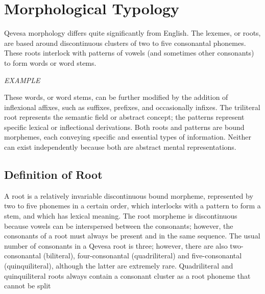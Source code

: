\documentclass[grammar]{subfiles}
\begin{document}
	\chapter{Morphological Typology}
	\label{ch:morphological_typology}

	
	Qevesa morphology differs quite significantly from English. The lexemes, or roots, are based around discontinuous clusters of two to five consonantal phonemes. These roots interlock with patterns of vowels (and sometimes other consonants) to form words or word stems.

	\begin{exe}
		\ex \emph{EXAMPLE}
	\end{exe}

	These words, or word stems, can be further modified by the addition of inflexional affixes, such as suffixes, prefixes, and occasionally infixes. The triliteral root represents the semantic field or abstract concept; the patterns represent specific lexical or inflectional derivations. Both roots and patterns are bound morphemes, each conveying specific and essential types of information. Neither can exist independently because both are abstract mental representations. 

	\section{Definition of Root}
	\label{sec:definition_of_root}

	A root is a relatively invariable discontinuous bound morpheme, represented by two to five phonemes in a certain order, which interlocks with a pattern to form a stem, and which has lexical meaning. The root morpheme is discontinuous because vowels can be interspersed between the consonants; however, the consonants of a root must always be present and in the same sequence. The usual number of consonants in a Qevesa root is three; however, there are also two-consonantal (biliteral), four-consonantal (quadriliteral) and five-consonantal (quinquiliteral), although the latter are extremely rare. Quadriliteral and quinquiliteral roots always contain a consonant cluster as a root phoneme that cannot be split
\end{document}
